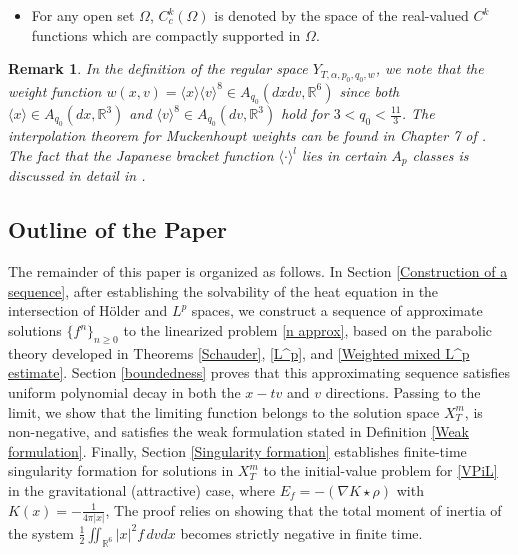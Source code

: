 \documentclass[reqno,11pt,final]{amsart}
\theoremstyle{plain}
\newtheorem{remark}[theorem]{Remark}
\numberwithin{equation}{section}
\numberwithin{theorem}{section}
\newcommand{\eqdef }{\overset{\mbox{\tiny{def}}}{=}}
\begin{document}
\begin{itemize}
\begin{align*}
    \|f\|^p_{L^p_k(\mathbb{R}^d)} \eqdef \int_{\mathbb{R}^d} \langle x\rangle^k |f(x)|^p\,dx < \infty,
\end{align*}with the usual modification when $p=\infty$. The corresponding homogeneous weighted space is denoted by $\dot{L}^p_k(\mathbb{R}^d)$. It is defined as the set of measurable functions $f : \mathbb{R}^d\to\overline{\mathbb{R}}$ satisfying
\begin{align*}
    \|f\|^p_{\dot{L}^p_k(\mathbb{R}^d)} \eqdef \int_{\mathbb{R}^d} |x|^k|f(x)|^p\,dx <\infty,
\end{align*}again with the usual modification when $p=\infty$.
\item For any open set $\Omega$, $C_c^k(\Omega)$ is denoted by the space of the real-valued $C^k$ functions which are compactly supported in $\Omega$. 
\end{itemize}

\begin{remark}In the definition of the regular space $Y_{T,\alpha,p_0,q_0,w}$, we note that the weight function $w(x,v) = \langle x\rangle\langle v\rangle^8\in A_{q_0}(dxdv, \mathbb{R}^6)$ since both $\langle x\rangle \in A_{q_0}(dx, \mathbb{R}^3)$ and $\langle v\rangle^8 \in A_{q_0}(dv, \mathbb{R}^3)$ hold for $3<q_0<\frac{11}{3}$. The interpolation theorem for Muckenhoupt weights can be found in Chapter 7 of \cite{FA_Grafakos_2014}. The fact that the Japanese bracket function $\langle \cdot \rangle^l$ lies in certain $A_p$ classes is discussed in detail in \cite{FA_Duarte_2023}.
\end{remark}


\subsection{Outline of the Paper} The remainder of this paper is organized as follows. In Section \ref{Construction of a sequence}, after establishing the solvability of the heat equation in the intersection of Hölder and $L^p$ spaces, we construct a sequence of approximate solutions $\{f^n\}_{n\ge 0}$ to the linearized problem \eqref{n approx}, based on the parabolic theory developed in Theorems \ref{Schauder}, \ref{L^p},  and \ref{Weighted mixed L^p estimate}. Section \ref{boundedness} proves that this approximating sequence satisfies uniform polynomial decay in both the $x-tv$ and $v$ directions. Passing to the limit, we show that the limiting function belongs to the solution space $X_T^m$, is non-negative, and satisfies the weak formulation stated in Definition \ref{Weak formulation}. Finally, Section \ref{Singularity formation} establishes finite-time singularity formation for solutions in $X_T^m$ to the initial-value problem for \eqref{VPiL} in the gravitational (attractive) case, where $E_f=-(\nabla K\star\rho)$ with $K(x)=-\frac{1}{4\pi|x|}$, The proof relies on showing that the total moment of inertia of the system $\frac{1}{2}\iint_{\mathbb{R}^6} |x|^2 f\, dv dx$ becomes strictly negative in finite time.
\end{document}
